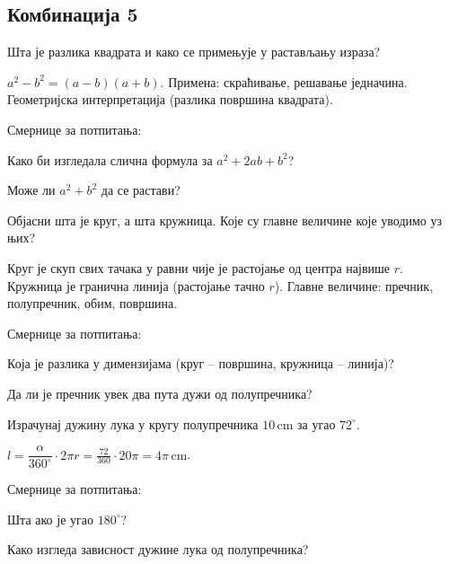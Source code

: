 \documentclass[12pt]{exam}
\begin{document}
\subsection*{Комбинација 5}
\begin{questions}
\question Шта је разлика квадрата и како се примењује у растављању израза?
\begin{solution}
$a^2-b^2=(a-b)(a+b)$.  
Примена: скраћивање, решавање једначина. Геометријска интерпретација (разлика површина квадрата).

Смернице за потпитања:
  \par Како би изгледала слична формула за $a^2+2ab+b^2$?
  \par Може ли $a^2+b^2$ да се растави?
\end{solution}

\question Објасни шта је круг, а шта кружница. Које су главне величине које уводимо уз њих?
\begin{solution}
Круг је скуп свих тачака у равни чије је растојање од центра највише $r$.  
Кружница је гранична линија (растојање тачно $r$).  
Главне величине: пречник, полупречник, обим, површина.

Смернице за потпитања:
  \par Која је разлика у димензијама (круг – површина, кружница – линија)?
  \par Да ли је пречник увек два пута дужи од полупречника?
\end{solution}

\question Израчунај дужину лука у кругу полупречника $10\,\mathrm{cm}$ за угао $72^\circ$.
\begin{solution}
$l=\dfrac{\alpha}{360^\circ}\cdot 2\pi r=\frac{72}{360}\cdot 20\pi=4\pi\,\mathrm{cm}$.

Смернице за потпитања:
  \par Шта ако је угао $180^\circ$? 
  \par Како изгледа зависност дужине лука од полупречника?
\end{solution}
\end{questions}
\end{document}
